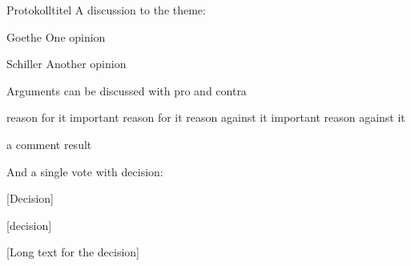 \documentclass[ngerman]{scrartcl}
\begin{document}
\begin{Minutes}{Protokolltitel}
		A discussion to the theme:
		\begin{Opinions}
		\item[Goethe] One opinion
		\item[Schiller] Another opinion
		\end{Opinions}

		Arguments can be discussed with pro and contra
		\begin{Argumentation}
		\pro reason for it
		\Pro important reason for it
		\contra reason against it
		\Contra important reason against it
		\item a comment
		\result result
		\end{Argumentation}


		And a single vote with decision:\par

		[Decision]

		\begin{Vote}
		[decision]
		\end{Vote}

		[Long text for the decision]

	\end{Minutes}
\end{document}
